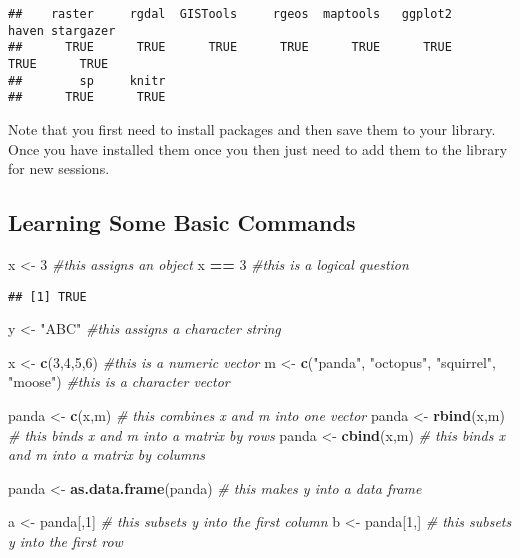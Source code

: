 \documentclass[
]{article}
\newenvironment{Shaded}{\begin{snugshade}}{\end{snugshade}}
\newcommand{\CommentTok}[1]{\textcolor[rgb]{0.56,0.35,0.01}{\textit{#1}}}
\newcommand{\DecValTok}[1]{\textcolor[rgb]{0.00,0.00,0.81}{#1}}
\newcommand{\KeywordTok}[1]{\textcolor[rgb]{0.13,0.29,0.53}{\textbf{#1}}}
\newcommand{\NormalTok}[1]{#1}
\newcommand{\OperatorTok}[1]{\textcolor[rgb]{0.81,0.36,0.00}{\textbf{#1}}}
\newcommand{\StringTok}[1]{\textcolor[rgb]{0.31,0.60,0.02}{#1}}
\begin{document}
\begin{verbatim}
##    raster     rgdal  GISTools     rgeos  maptools   ggplot2     haven stargazer 
##      TRUE      TRUE      TRUE      TRUE      TRUE      TRUE      TRUE      TRUE 
##        sp     knitr 
##      TRUE      TRUE
\end{verbatim}

Note that you first need to install packages and then save them to your
library. Once you have installed them once you then just need to add
them to the library for new sessions.

\hypertarget{learning-some-basic-commands}{%
\subsection{Learning Some Basic
Commands}\label{learning-some-basic-commands}}

\begin{Shaded}
\begin{Highlighting}[]
\NormalTok{x <-}\StringTok{ }\DecValTok{3} \CommentTok{#this assigns an object}
\NormalTok{x }\OperatorTok{==}\StringTok{ }\DecValTok{3} \CommentTok{#this is a logical question }
\end{Highlighting}
\end{Shaded}

\begin{verbatim}
## [1] TRUE
\end{verbatim}

\begin{Shaded}
\begin{Highlighting}[]
\NormalTok{y <-}\StringTok{ "ABC"} \CommentTok{#this assigns a character string }

\NormalTok{x <-}\StringTok{ }\KeywordTok{c}\NormalTok{(}\DecValTok{3}\NormalTok{,}\DecValTok{4}\NormalTok{,}\DecValTok{5}\NormalTok{,}\DecValTok{6}\NormalTok{) }\CommentTok{#this is a numeric vector}
\NormalTok{m <-}\StringTok{ }\KeywordTok{c}\NormalTok{(}\StringTok{"panda"}\NormalTok{, }\StringTok{"octopus"}\NormalTok{, }\StringTok{"squirrel"}\NormalTok{, }\StringTok{"moose"}\NormalTok{) }\CommentTok{#this is a character vector }

\NormalTok{panda <-}\StringTok{ }\KeywordTok{c}\NormalTok{(x,m) }\CommentTok{# this combines x and m into one vector}
\NormalTok{panda <-}\StringTok{ }\KeywordTok{rbind}\NormalTok{(x,m) }\CommentTok{# this binds x and m into a matrix by rows}
\NormalTok{panda <-}\StringTok{ }\KeywordTok{cbind}\NormalTok{(x,m) }\CommentTok{# this binds x and m into a matrix by columns }

\NormalTok{panda <-}\StringTok{ }\KeywordTok{as.data.frame}\NormalTok{(panda) }\CommentTok{# this makes y into a data frame }

\NormalTok{a <-}\StringTok{ }\NormalTok{panda[,}\DecValTok{1}\NormalTok{] }\CommentTok{# this subsets y into the first column }
\NormalTok{b <-}\StringTok{ }\NormalTok{panda[}\DecValTok{1}\NormalTok{,] }\CommentTok{# this subsets y into the first row }
\end{Highlighting}
\end{Shaded}
\end{document}
